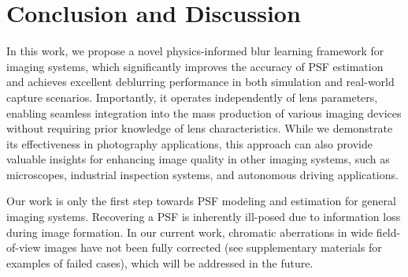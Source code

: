 \section{Conclusion and Discussion}

In this work, we propose a novel physics-informed blur learning framework for imaging systems, which significantly improves the accuracy of PSF estimation and achieves excellent deblurring performance in both simulation and real-world capture scenarios. Importantly, it operates independently of lens parameters, enabling seamless integration into the mass production of various imaging devices without requiring prior knowledge of lens characteristics. While we demonstrate its effectiveness in photography applications, this approach can also provide valuable insights for enhancing image quality in other imaging systems, such as microscopes, industrial inspection systems, and autonomous driving applications.

Our work is only the first step towards PSF modeling and estimation for general imaging systems. Recovering a PSF is inherently ill-posed due to information loss during image formation. In our current work, chromatic aberrations in wide field-of-view images have not been fully corrected (see supplementary materials for examples of failed cases), which will be addressed in the future.


